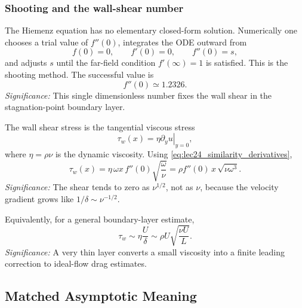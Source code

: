 \documentclass[../main.tex]{subfiles}
\begin{document}
\subsubsection*{Shooting and the wall-shear number}
The Hiemenz equation has no elementary closed-form solution.  Numerically one
chooses a trial value of $f''(0)$, integrates the ODE outward from
\[
  f(0)=0,\qquad f'(0)=0,\qquad f''(0)=s,
\]
and adjusts $s$ until the far-field condition $f'(\infty)=1$ is satisfied.
This is the shooting method.  The successful value is
\begin{equation}
  \boxed{f''(0)\simeq 1.2326.}
  \label{eq:lec24_hiemenz_wall_shear_number}
\end{equation}
\textit{Significance:} This single dimensionless number fixes the wall shear in
the stagnation-point boundary layer.

The wall shear stress is the tangential viscous stress
\begin{equation}
  \tau_w(x)=\eta\left.\partial_yu\right|_{y=0},
  \label{eq:lec24_wall_shear_definition}
\end{equation}
where $\eta=\rho\nu$ is the dynamic viscosity.  Using
\eqref{eq:lec24_similarity_derivatives},
\begin{equation}
  \boxed{
  \tau_w(x)
  =\eta\,\omega x\,f''(0)\sqrt{\frac{\omega}{\nu}}
  =\rho f''(0)\,x\,\sqrt{\nu\omega^3}.}
  \label{eq:lec24_wall_shear_result}
\end{equation}
\textit{Significance:} The shear tends to zero as $\nu^{1/2}$, not as $\nu$,
because the velocity gradient grows like $1/\delta\sim\nu^{-1/2}$.

Equivalently, for a general boundary-layer estimate,
\begin{equation}
  \boxed{\tau_w\sim\eta\frac{U}{\delta}
  \sim\rho U\sqrt{\frac{\nu U}{L}}.}
  \label{eq:lec24_shear_scaling_general}
\end{equation}
\textit{Significance:} A very thin layer converts a small viscosity into a
finite leading correction to ideal-flow drag estimates.

\subsection{Matched Asymptotic Meaning}\label{sec:lec24:matched-asymptotics}
\end{document}
